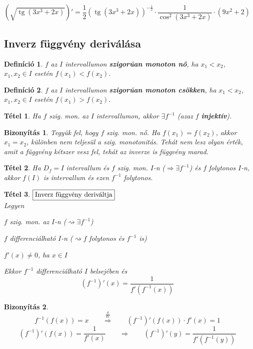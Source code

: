 \documentclass[a4paper,12pt,twoside]{book}
\DeclareMathOperator{\tg}{tg}
\newtheorem{tetel}{Tétel}[chapter]
\newtheorem{defi}{Definíció}[chapter]
\theoremstyle{break}
\newtheorem{biz}{Bizonyítás}[chapter]
\theoremstyle{plain}
\begin{document}
$\left(\sqrt{\tg(3x^3+2x)}\right)' = \dfrac{1}{2}(\tg(3x^3+2x))^{-\frac{1}{2}}\cdot \dfrac{1}{\cos^2 (3x^3+2x)}\cdot (9x^2+2)$

\subsection{Inverz függvény deriválása}

\begin{defi}
 $f$ az $I$ intervallumon \textbf{szigorúan monoton nő}, ha $x_1 < x_2$, $x_1, x_2 \in I$ esetén $f(x_1) < f(x_2)$.
\end{defi}

\begin{defi}
 $f$ az $I$ intervallumon \textbf{szigorúan monoton csökken}, ha $x_1 < x_2$, $x_1, x_2 \in I$ esetén $f(x_1) > f(x_2)$.
\end{defi}

\begin{tetel}
 Ha $f$ szig. mon. az $I$ intervallumon, akkor $\exists f^{-1}$ (azaz $f$ \textbf{injektív}).
\end{tetel}
\begin{biz}
 Tegyük fel, hogy $f$ szig. mon. nő. Ha $f(x_1) = f(x_2)$, akkor $x_1 = x_2$, különben nem teljesül a szig. monotonitás. Tehát nem lesz olyan érték, amit a függvény kétszer vesz fel, tehát az inverze is függvény marad.
\end{biz}

\begin{tetel}
 Ha $D_f = I$ intervallum és $f$ szig. mon. $I$-n ($\Rightarrow \exists f^{-1}$) és $f$ folytonos $I$-n, akkor $f(I)$ is intervallum és ezen $f^{-1}$ folytonos.
\end{tetel}
\addtocounter{biz}{1}

\begin{tetel} $\boxed{$Inverz függvény deriváltja$}$\\
Legyen
\begin{itemize*}
 \item $f$ szig. mon. az $I$-n ($\rightsquigarrow \exists f^{-1}$)
 \item $f$ differenciálható $I$-n ($\rightsquigarrow f$ folytonos és $f^{-1}$ is)
 \item $f'(x) \neq 0$, ha $x\in I$
\end{itemize*}
Ekkor $f^{-1}$ differenciálható $I$ belsejében és
\[(f^{-1})'(x) = \frac{1}{f'(f^{-1}(x))}\]

\end{tetel}
\begin{biz}
 \[f^{-1}(f(x)) = x \qquad \overset{\frac{d}{dx}}{\Longrightarrow} \qquad (f^{-1})'(f(x))\cdot f'(x)= 1\]
 \[(f^{-1})'(f(x)) = \frac{1}{f'(x)} \qquad \Rightarrow \qquad (f^{-1})'(y) = \frac{1}{f'(f^{-1}(y))}\]
\end{biz}
\end{document}
